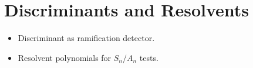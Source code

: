 \section{Discriminants and Resolvents}
\begin{itemize}
  \item Discriminant as ramification detector.
  \item Resolvent polynomials for $S_n/A_n$ tests.
\end{itemize}
